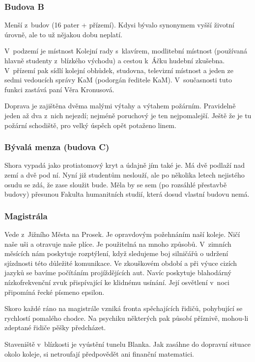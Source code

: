 \subsubsection{Budova B}

Menší z~budov (16 pater + přízemí). Kdysi bývalo synonymem vyšší životní úrovně, ale to už nějakou dobu neplatí.

V~podzemí je místnost Kolejní
rady s~klavírem, modlitební místnost (používaná hlavně studenty z~blízkého východu) a cestou k~Áčku hudební
zkušebna. V~přízemí pak sídlí kolejní obhůdek, studovna, televizní místnost a jeden
ze sedmi vedoucích správy KaM (podorgán ředitele KaM).
V~současnosti tuto funkci zastává paní Věra Kronusová.

Doprava je zajištěna dvěma malými výtahy a výtahem požárním. Pravidelně jeden až dva z~nich nejezdí; nejméně poruchový je ten nejpomalejší. Ještě že je tu požární schodiště, pro velký úspěch opět potaženo linem. 


\subsubsection{Bývalá menza (budova C)}

Shora vypadá jako protiatomový kryt a údajně jím také je. Má dvě
podlaží nad zemí a dvě pod ní. Nyní již studentům neslouží, ale po
několika letech nejistého osudu se zdá, že zase sloužit bude. Měla
by se sem (po rozsáhlé přestavbě budovy) přesunou Fakulta
humanitních studií, která dosud vlastní budovu nemá.

\subsubsection{Magistrála}

Vede z~Jižního Města na Prosek. Je opravdovým požehnáním naší
koleje. Ničí naše uši a otravuje naše plíce. Je použitelná na
mnoho způsobů. V~zimních měsících nám poskytuje rozptýlení, když
sledujeme boj silničářů o udržení sjízdnosti této důležité
komunikace. Ve zkouškovém období a při výuce cizích jazyků se
bavíme počítáním projíždějících aut. Navíc poskytuje blahodárný
nízkofrekvenční zvuk přispívající ke klidnému usínání. Její
osvětlení v~noci připomíná řecké písmeno epsilon.

Skoro každé ráno na magistrále vzniká fronta spěchajících řidičů,
pohybující se rychlostí pomalého chodce.  Na psychiku některých
pak působí příznivě, mohou-li zdeptané řidiče pěšky předcházet.

Staveniště v~blízkosti je vyústění tunelu Blanka. Jak zasáhne do
dopravní situace okolo koleje, si netroufají předpovědět ani
finanční matematici.

